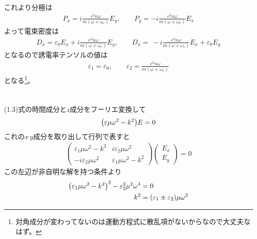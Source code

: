 \documentclass[../../master.tex]{subfiles}
\begin{document}
これより分極は
\begin{align}
    P_x = i\frac{e^2n\omega}{m(\omega+\omega_c)}E_{y},\qquad
    P_y = -i\frac{e^2n\omega}{m(\omega+\omega_c)}E_{x}
\end{align}
よって電束密度は
\begin{align}
    D_x = \varepsilon_0 E_x + i\frac{e^2n\omega}{m(\omega+\omega_c)}E_y,\qquad
    D_x = \ -i\frac{e^2n\omega}{m(\omega+\omega_c)}E_x + \varepsilon_0 E_y
\end{align}
となるので誘電率テンソルの値は
\begin{align}
    \varepsilon_1 = \varepsilon_0,\qquad \varepsilon_2 = \frac{e^2n\omega}{m(\omega+\omega_c)}
\end{align}
となる\footnote{対角成分が変わってないのは運動方程式に散乱項がないからなので大丈夫なはず。}。

\section{}
\subsection{}
(1.3)式の時間成分と\(z\)成分をフーリエ変換して
\begin{align}
    \qty(\varepsilon\mu\omega^2 -k^2)E = 0
\end{align}
これの\(x\,y\)成分を取り出して行列で表すと
\begin{align}
    \begin{pmatrix}
        \varepsilon_1\mu\omega^2-k^2 & i\varepsilon_2\mu\omega^2\\
        -i\varepsilon_2\mu\omega^2 & \varepsilon_1\mu\omega^2-k^2
    \end{pmatrix}\begin{pmatrix}
        E_x\\E_y
    \end{pmatrix}=0
\end{align}
この左辺が非自明な解を持つ条件より
\begin{align}
    \qty(\varepsilon_1\mu\omega^2-k^2)^2-\varepsilon_2^2\mu^2\omega^4 &= 0\\
    k^2&=(\varepsilon_1\pm \varepsilon_2)\mu\omega^2
\end{align}
\end{document}
